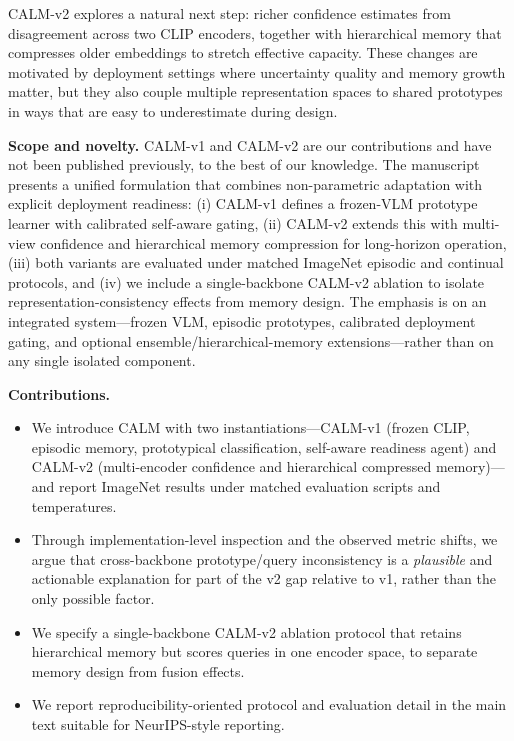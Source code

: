 \documentclass{article}
\begin{document}
CALM-v2 explores a natural next step: richer confidence estimates from disagreement across two CLIP encoders, together with hierarchical memory that compresses older embeddings to stretch effective capacity. These changes are motivated by deployment settings where uncertainty quality and memory growth matter, but they also couple multiple representation spaces to shared prototypes in ways that are easy to underestimate during design.

\textbf{Scope and novelty.} CALM-v1 and CALM-v2 are our contributions and have not been published previously, to the best of our knowledge. The manuscript presents a unified formulation that combines non-parametric adaptation with explicit deployment readiness: (i) CALM-v1 defines a frozen-VLM prototype learner with calibrated self-aware gating, (ii) CALM-v2 extends this with multi-view confidence and hierarchical memory compression for long-horizon operation, (iii) both variants are evaluated under matched ImageNet episodic and continual protocols, and (iv) we include a single-backbone CALM-v2 ablation to isolate representation-consistency effects from memory design. The emphasis is on an integrated system---frozen VLM, episodic prototypes, calibrated deployment gating, and optional ensemble/hierarchical-memory extensions---rather than on any single isolated component.

\textbf{Contributions.}
\begin{itemize}
    \item We introduce CALM with two instantiations---CALM-v1 (frozen CLIP, episodic memory, prototypical classification, self-aware readiness agent) and CALM-v2 (multi-encoder confidence and hierarchical compressed memory)---and report ImageNet results under matched evaluation scripts and temperatures.
    \item Through implementation-level inspection and the observed metric shifts, we argue that cross-backbone prototype/query inconsistency is a \emph{plausible} and actionable explanation for part of the v2 gap relative to v1, rather than the only possible factor.
    \item We specify a single-backbone CALM-v2 ablation protocol that retains hierarchical memory but scores queries in one encoder space, to separate memory design from fusion effects.
    \item We report reproducibility-oriented protocol and evaluation detail in the main text suitable for NeurIPS-style reporting.
\end{itemize}
\end{document}

